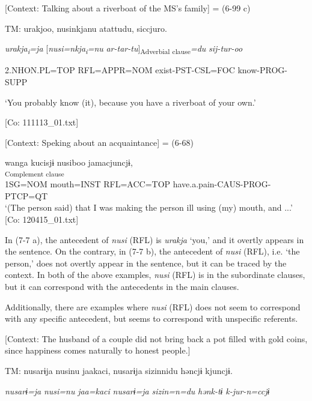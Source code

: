 \ea \label{ex:7:7}  
\ea\label{ex:7:7a}  [Context: Talking about a riverboat of the MS’s family] = (6-99 c)

    TM:  urakjoo,  nusinkjanu  atattudu,   siccjuro.

      \textit{urakja\textsubscript{i}}\textit{=ja}  [\textit{nusi=nkja\textsubscript{i}}\textit{=nu}  \textit{ar-tar-tu}]\textsubscript{Adverbial clause}\textit{=du}  \textit{sij-tur-oo}
                                                                                                                                                                      
      2.NHON.PL=TOP  RFL=APPR=NOM  exist-PST-CSL=FOC   know-PROG-SUPP

      ‘You probably know (it), because you have a riverboat of your own.’

      [Co: 111113\_01.txt]

  \ex\label{ex:7:7b}  [Context: Speking about an acquaintance] = (6-68)

\glll  wanga  kucisjɨ  nusiboo  jamacjuncjɨ,\\
[\textit{wan=ga}  \textit{kuci=sjɨ}  \textit{nusi=ba=ja}  \textit{jam-as-tur-n=ccjɨ}]\textsubscript{Complement clause}\\
1SG=NOM  mouth=INST  RFL=ACC=TOP  have.a.pain-CAUS-PROG-PTCP=QT\\
\glt ‘(The person said) that I was making the person\textit{\textsubscript{} }ill using (my) mouth, and ...’ [Co: 120415\_01.txt]
\z
\z

In (7-7 a), the antecedent of \textit{nusi} (RFL) is \textit{urakja} ‘you,’ and it overtly appears in the sentence. On the contrary, in (7-7 b), the antecedent of \textit{nusi} (RFL), i.e. ‘the person,’ does not overtly appear in the sentence, but it can be traced by the context. In both of the above examples, \textit{nusi} (RFL) is in the subordinate clauses, but it can correspond with the antecedents in the main clauses.

  Additionally, there are examples where \textit{nusi} (RFL) does not seem to correspond with any specific antecedent, but seems to correspond with unspecific referents.

\ea \label{ex:7:8}  [Context: The husband of a couple did not bring back a pot filled with gold coins, since happiness comes naturally to honest people.]

  TM:  nusarɨja  nusinu  jaakaci,  nusarɨja  sizinnidu   həncjɨ  kjuncjɨ.

    \textit{nusarɨ=ja}  \textit{nusi=nu}  \textit{jaa=kaci}  \textit{nusarɨ=ja}  \textit{sizin=n=du} \textit{hənk-tɨ}  \textit{k-jur-n=ccjɨ}
                                                                                                    
